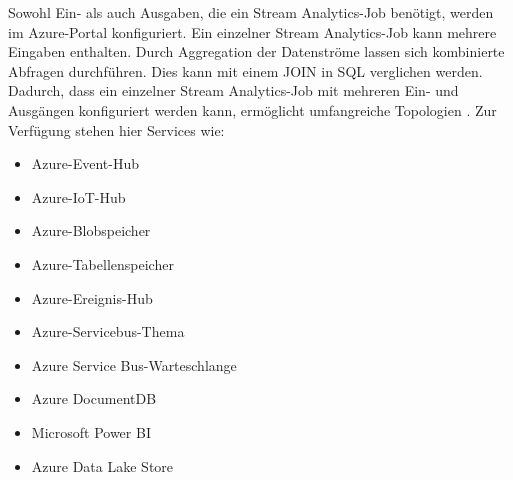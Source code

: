 Sowohl Ein- als auch Ausgaben, die ein Stream Analytics-Job benötigt, werden im Azure-Portal konfiguriert. Ein einzelner Stream Analytics-Job kann mehrere Eingaben enthalten. Durch Aggregation der Datenströme lassen sich kombinierte Abfragen durchführen. Dies kann mit einem JOIN in SQL verglichen werden. Dadurch, dass ein einzelner Stream Analytics-Job mit mehreren Ein- und Ausgängen konfiguriert werden kann, ermöglicht umfangreiche Topologien \cite{Prosise.}. Zur Verfügung stehen hier Services wie:
\begin{itemize}
	\item Azure-Event-Hub
	\item Azure-IoT-Hub
	\item Azure-Blobspeicher 
	\item Azure-Tabellenspeicher 
	\item Azure-Ereignis-Hub 
	\item Azure-Servicebus-Thema 
	\item Azure Service Bus-Warteschlange 
	\item Azure DocumentDB 
	\item Microsoft Power BI 
	\item Azure Data Lake Store 
\end{itemize}


